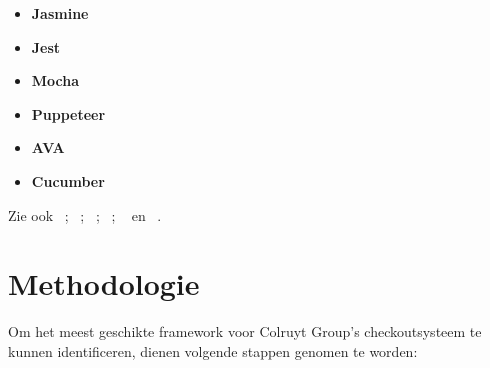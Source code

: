 \begin{itemize}
    \item \textbf{Jasmine}
    \item \textbf{Jest}
    \item \textbf{Mocha}
    \item \textbf{Puppeteer}
    \item \textbf{AVA}
    \item \textbf{Cucumber}
\end{itemize}

\vspace{\baselineskip}

Zie ook ~\cite{Castro2019}; ~\cite{Definition2019}; ~\cite{Kamalizade2019}; ~\cite{Lotanna2019}; ~\cite{Roy2019} en ~\cite{Zaidman2019}.





\section{Methodologie}
\label{sec:methodologie}

Om het meest geschikte framework voor Colruyt Group's checkoutsysteem te kunnen identificeren, dienen volgende stappen genomen te worden:

